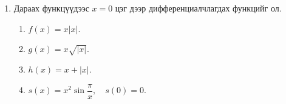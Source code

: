 \begin{enumerate}
\begin{enumerate}[label=(\alph*)]
  \item $y = \dfrac{1}{x}$  , $c=0$
  \item $y = x^{3} - 17x$ , $c=1$
  \item $y = \dfrac{2}{1 + x^{2}}$  , $c=-1$
  \item $y = \sqrt{x}$  , $c=9$
  \item $y = \dfrac{1}{\sqrt{x}}$  , $c=4$
\end{enumerate}
\item 
Дараах функцүүдээс $x=0$ цэг дээр дифференциалчлагдах функцийг ол.
\begin{enumerate}[label=(\alph*)]
  \item $f(x) = x|x|.$
  \item $g(x) = x\sqrt{|x|}.$
  \item $h(x) = x + |x|.$
  \item $s(x) = x^{2}\sin\dfrac{\pi}{x}, \quad s(0)=0.$
\end{enumerate}
\end{enumerate}